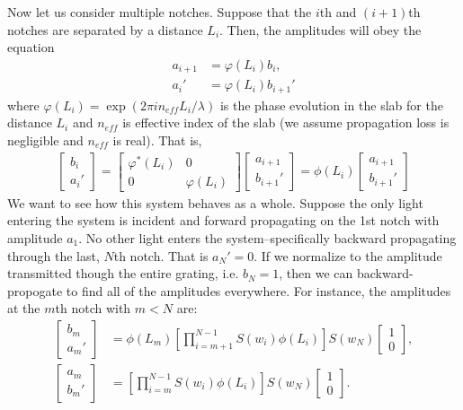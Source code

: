 \documentclass[10pt, letter, oneside,graphicx]{article}
\begin{document}
Now let us consider multiple notches. %
Suppose that the $i$th and $(i+1)$th notches are separated by a distance $L_i$. Then, the amplitudes will obey the equation
\begin{align*}
a_{i+1} &= \varphi(L_i) b_{i}, \\
a_i' &= \varphi(L_i) b_{i+1}'
\end{align*}
where $\varphi(L_i) = \exp(2\pi in_{eff}L_i/\lambda)$ is the phase evolution in the slab for the distance $L_i$ and $n_{eff}$ is effective index of the slab (we assume propagation loss is negligible and $n_{eff}$ is real). That is,
\begin{align*}
\left[ \begin{array}{c}
b_i \\ a_i'
\end{array} \right]
=
\left[ \begin{array}{cc}
\varphi^*(L_i) & 0 \\
0 & \varphi(L_i)
\end{array} \right]
\left[ \begin{array}{c}
a_{i+1} \\ b_{i+1}'
\end{array} \right]
=
\phi(L_i)
\left[ \begin{array}{c}
a_{i+1} \\ b_{i+1}'
\end{array} \right]
\end{align*}
We want to see how this system behaves as a whole. Suppose the only light entering the system is incident and forward propagating on the 1st notch with amplitude $a_1$. No other light enters the system--specifically backward propagating through the last, $N$th notch. That is $a_N' = 0$. If we normalize to the amplitude transmitted though the entire grating, i.e. $b_N = 1$, then we can backward-propogate to find all of the amplitudes everywhere. For instance, the amplitudes at the $m$th notch with $m < N$ are:
\begin{align*}
\left[ \begin{array}{c}
b_m \\ a_m'
\end{array} \right]
&=
\phi(L_m)
\left[
\prod_{i = m+1}^{N-1}
S(w_i)
\phi(L_i)
\right]
S(w_N)
\left[ \begin{array}{c}
1 \\ 0
\end{array} \right], \\
\left[ \begin{array}{c}
a_m \\ b_m'
\end{array} \right]
&=
\left[
\prod_{i = m}^{N-1}
S(w_i)
\phi(L_i)
\right]
S(w_N)
\left[ \begin{array}{c}
1 \\ 0
\end{array} \right].
\end{align*}
\end{document}
